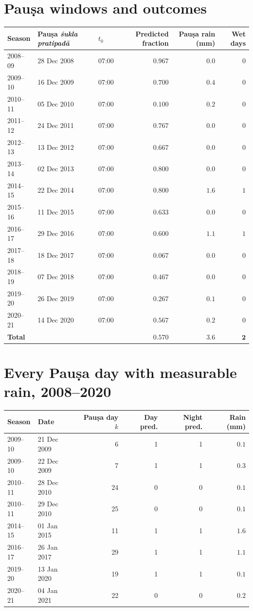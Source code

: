 \documentclass[11pt,a4paper]{article}
\newcommand{\skt}[1]{\textcolor{skt}{\textit{#1}}}
\begin{document}
\appendix
\section{Pauṣa windows and outcomes}

\begin{longtable}{lllrrr}
\toprule
Season & Pauṣa \skt{śukla pratipadā} & $t_0$ & Predicted fraction & Pauṣa rain (mm) & Wet days\\
\midrule\endhead
2008--09 & 28 Dec 2008 & 07:00 & $0.967$ & $0.0$ & $0$\\
2009--10 & 16 Dec 2009 & 07:00 & $0.700$ & $0.4$ & $0$\\
2010--11 & 05 Dec 2010 & 07:00 & $0.100$ & $0.2$ & $0$\\
2011--12 & 24 Dec 2011 & 07:00 & $0.767$ & $0.0$ & $0$\\
2012--13 & 13 Dec 2012 & 07:00 & $0.667$ & $0.0$ & $0$\\
2013--14 & 02 Dec 2013 & 07:00 & $0.800$ & $0.0$ & $0$\\
2014--15 & 22 Dec 2014 & 07:00 & $0.800$ & $1.6$ & $1$\\
2015--16 & 11 Dec 2015 & 07:00 & $0.633$ & $0.0$ & $0$\\
2016--17 & 29 Dec 2016 & 07:00 & $0.600$ & $1.1$ & $1$\\
2017--18 & 18 Dec 2017 & 07:00 & $0.067$ & $0.0$ & $0$\\
2018--19 & 07 Dec 2018 & 07:00 & $0.467$ & $0.0$ & $0$\\
2019--20 & 26 Dec 2019 & 07:00 & $0.267$ & $0.1$ & $0$\\
2020--21 & 14 Dec 2020 & 07:00 & $0.567$ & $0.2$ & $0$\\
\midrule
\textbf{Total} & & & $0.570$ & $\mathbf{3.6}$ & $\mathbf{2}$\\
\bottomrule
\end{longtable}

\section{Every Pauṣa day with measurable rain, 2008--2020}

\begin{longtable}{llrrrr}
\toprule
Season & Date & Pauṣa day $k$ & Day pred. & Night pred. & Rain (mm)\\
\midrule\endhead
2009--10 & 21 Dec 2009 & 6 & 1 & 1 & $0.1$\\
2009--10 & 22 Dec 2009 & 7 & 1 & 1 & $0.3$\\
2010--11 & 28 Dec 2010 & 24 & 0 & 0 & $0.1$\\
2010--11 & 29 Dec 2010 & 25 & 0 & 0 & $0.1$\\
2014--15 & 01 Jan 2015 & 11 & 1 & 1 & $\mathbf{1.6}$\\
2016--17 & 26 Jan 2017 & 29 & 1 & 1 & $\mathbf{1.1}$\\
2019--20 & 13 Jan 2020 & 19 & 1 & 1 & $0.1$\\
2020--21 & 04 Jan 2021 & 22 & 0 & 0 & $0.2$\\
\bottomrule
\end{longtable}
\end{document}
